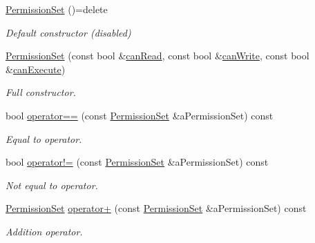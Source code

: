 \begin{DoxyCompactItemize}
\item 
\hyperlink{classlibrary_1_1core_1_1fs_1_1PermissionSet_a8a6eb39cc2a8bca92a657d065d3e36ba}{Permission\+Set} ()=delete
\begin{DoxyCompactList}\small\item\em Default constructor (disabled) \end{DoxyCompactList}\item 
\hyperlink{classlibrary_1_1core_1_1fs_1_1PermissionSet_a39ee30a6f35f325c1cd7bcd307ab11aa}{Permission\+Set} (const bool \&\hyperlink{classlibrary_1_1core_1_1fs_1_1PermissionSet_af31f6c5e1bd75102749648fd41882beb}{can\+Read}, const bool \&\hyperlink{classlibrary_1_1core_1_1fs_1_1PermissionSet_a12851523996c6c4414749ee9c2f3bbd2}{can\+Write}, const bool \&\hyperlink{classlibrary_1_1core_1_1fs_1_1PermissionSet_a40da22aa91ee4c8963c1c5434dd8486c}{can\+Execute})
\begin{DoxyCompactList}\small\item\em Full constructor. \end{DoxyCompactList}\item 
bool \hyperlink{classlibrary_1_1core_1_1fs_1_1PermissionSet_a5233d51751bf61d545a283ee6767af47}{operator==} (const \hyperlink{classlibrary_1_1core_1_1fs_1_1PermissionSet}{Permission\+Set} \&a\+Permission\+Set) const
\begin{DoxyCompactList}\small\item\em Equal to operator. \end{DoxyCompactList}\item 
bool \hyperlink{classlibrary_1_1core_1_1fs_1_1PermissionSet_a7549184997b592bb790ccad3e9084a19}{operator!=} (const \hyperlink{classlibrary_1_1core_1_1fs_1_1PermissionSet}{Permission\+Set} \&a\+Permission\+Set) const
\begin{DoxyCompactList}\small\item\em Not equal to operator. \end{DoxyCompactList}\item 
\hyperlink{classlibrary_1_1core_1_1fs_1_1PermissionSet}{Permission\+Set} \hyperlink{classlibrary_1_1core_1_1fs_1_1PermissionSet_ade354e83f2e281f9a870e73479cfa83a}{operator+} (const \hyperlink{classlibrary_1_1core_1_1fs_1_1PermissionSet}{Permission\+Set} \&a\+Permission\+Set) const
\begin{DoxyCompactList}\small\item\em Addition operator. \end{DoxyCompactList}\item 

\end{DoxyCompactItemize}
